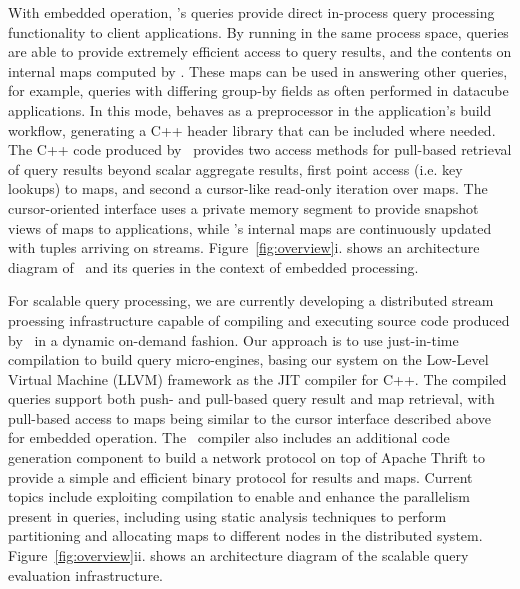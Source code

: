 With embedded operation, \compiler's queries provide direct in-process query
processing functionality to client applications. By running in the same process
space, queries are able to provide extremely efficient access to query results,
and the contents on internal maps computed by \compiler. These maps can be used
in answering other queries, for example, queries with differing group-by fields
as often performed in datacube applications.
In this mode, \compiler behaves as a preprocessor in the application's build
workflow, generating a C++ header library that can be included where needed.
The C++ code produced by \compiler\ provides two access methods for pull-based
retrieval of query results beyond scalar aggregate results, first point access
(i.e. key lookups) to maps, and second a cursor-like read-only iteration over
maps. The cursor-oriented interface uses a private memory segment to provide
snapshot views of maps to applications, while \compiler's internal maps are
continuously updated with tuples arriving on streams.
Figure~\ref{fig:overview}i. shows an architecture diagram of \compiler\ and its
queries in the context of embedded processing.

For scalable query processing, we are currently developing a distributed stream
proessing infrastructure capable of compiling and executing source code produced
by \compiler\ in a dynamic on-demand fashion. Our approach is to use
just-in-time compilation to build query micro-engines, basing our system on the
Low-Level Virtual Machine (LLVM) framework as the JIT compiler for C++. The
compiled queries support both push- and pull-based query result and map
retrieval, with pull-based access to maps being similar to the cursor interface
described above for embedded operation. The \compiler\ compiler also includes an
additional code generation component to build a network protocol on top of
Apache Thrift to provide a simple and efficient binary protocol for results and
maps. Current topics include exploiting compilation to enable and enhance the
parallelism present in queries, including using static analysis techniques to
perform partitioning and allocating maps to different nodes in the distributed
system. Figure~\ref{fig:overview}ii. shows an architecture diagram of the
scalable query evaluation infrastructure.